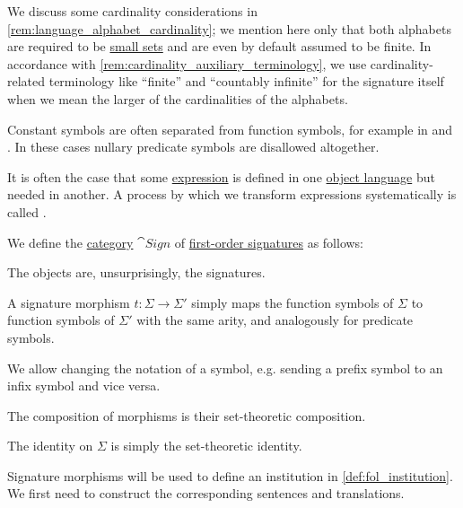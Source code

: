 \begin{comments}
  \item We discuss some cardinality considerations in \cref{rem:language_alphabet_cardinality}; we mention here only that both alphabets are required to be \hyperref[def:small_set]{small sets} and are even by default assumed to be finite. In accordance with \cref{rem:cardinality_auxiliary_terminology}, we use cardinality-related terminology like \enquote{finite} and \enquote{countably infinite} for the signature itself when we mean the larger of the cardinalities of the alphabets.

  \item Constant symbols are often separated from function symbols, for example in \cite[def. 2.1.2]{Hinman2005Logic} and \cite[def. 2.2.1]{VanDalen2004LogicAndStructure}. In these cases nullary predicate symbols are disallowed altogether.
\end{comments}

\begin{concept}\label{con:syntactic_translation}
  It is often the case that some \hyperref[con:expression]{expression} is defined in one \hyperref[con:metalanguage]{object language} but needed in another. A process by which we transform expressions systematically is called .
\end{concept}

\begin{definition}\label{def:fol_signature_category}
  We define the \hyperref[def:category]{category} \( \cat{Sign} \) of \hyperref[def:fol_signature]{first-order signatures} as follows:
  \begin{thmenum}
     The objects are, unsurprisingly, the signatures.

     A signature morphism \( t: \Sigma \to \Sigma' \) simply maps the function symbols of \( \Sigma \) to function symbols of \( \Sigma' \) with the same arity, and analogously for predicate symbols.

    We allow changing the notation of a symbol, e.g. sending a prefix symbol to an infix symbol and vice versa.

     The composition of morphisms is their set-theoretic composition.

     The identity on \( \Sigma \) is simply the set-theoretic identity.
  \end{thmenum}
\end{definition}
\begin{comments}
  \item Signature morphisms will be used to define an institution in \cref{def:fol_institution}. We first need to construct the corresponding sentences and translations.
\end{comments}

